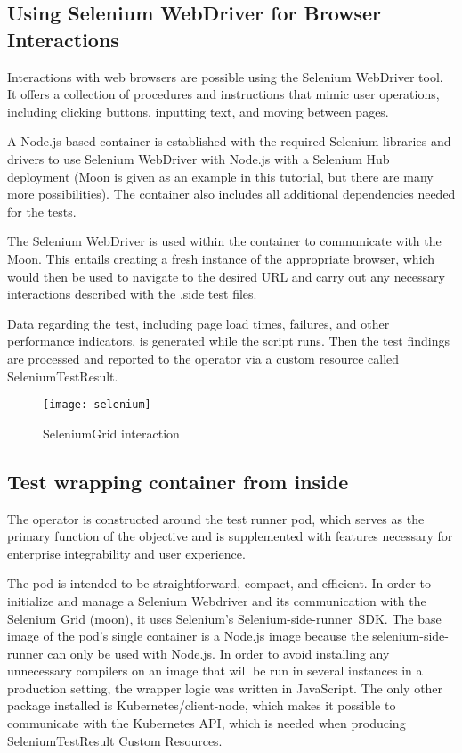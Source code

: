 \subsection{Using Selenium WebDriver for Browser Interactions}

Interactions with web browsers are possible using the Selenium WebDriver tool. It offers a collection of procedures and instructions that mimic user operations, including clicking buttons, inputting text, and moving between pages.

A Node.js based container is established with the required Selenium libraries and drivers to use Selenium WebDriver with Node.js with a Selenium Hub deployment (Moon is given as an example in this tutorial, but there are many more possibilities). The container also includes all additional dependencies needed for the tests.

The Selenium WebDriver is used within the container to communicate with the Moon. This entails creating a fresh instance of the appropriate browser, which would then be used to navigate to the desired URL and carry out any necessary interactions described with the .side test files.

Data regarding the test, including page load times, failures, and other performance indicators, is generated while the script runs. Then the test findings are processed and reported to the operator via a custom resource called SeleniumTestResult.

\begin{figure}[H]
	\centering
	\texttt{[image: selenium]}
	\label{fig:selenium}
	\caption{SeleniumGrid interaction}
\end{figure}

\subsection{Test wrapping container from inside}

The operator is constructed around the test runner pod, which serves as the primary function of the objective and is supplemented with features necessary for enterprise integrability and user experience.

The pod is intended to be straightforward, compact, and efficient. In order to initialize and manage a Selenium Webdriver and its communication with the Selenium Grid (moon), it uses Selenium's Selenium-side-runner SDK. The base image of the pod's single container is a Node.js image because the selenium-side-runner can only be used with Node.js. In order to avoid installing any unnecessary compilers on an image that will be run in several instances in a production setting, the wrapper logic was written in JavaScript. The only other package installed is Kubernetes/client-node, which makes it possible to communicate with the Kubernetes API, which is needed when producing SeleniumTestResult Custom Resources.

